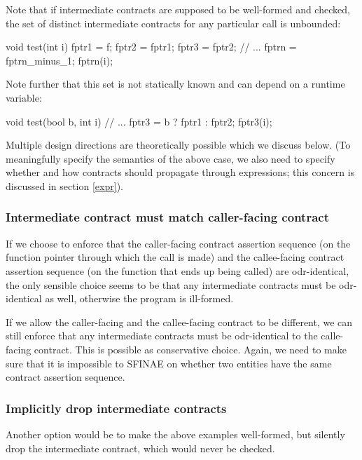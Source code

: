 Note that if intermediate contracts are supposed to be well-formed and checked, the set of distinct intermediate contracts for any particular call is unbounded:
\begin{codeblock}
void test(int i) {
  fptr1 = f;
  fptr2 = fptr1; 
  fptr3 = fptr2;
  // ...
  fptrn = fptrn_minus_1;
  fptrn(i);
}
\end{codeblock}
Note further that this set is not statically known and can depend on a runtime variable:
\begin{codeblock}
void test(bool b, int i) {
  // ...
  fptr3 = b ? fptr1 : fptr2;
  fptr3(i);
}
\end{codeblock}
Multiple design directions are theoretically possible which we discuss below. (To meaningfully specify the semantics of the above case, we also need to specify whether and how contracts should propagate through expressions; this concern is discussed in section \ref{expr}).


\subsubsection{Intermediate contract must match caller-facing contract}
\label{intermediatematch}

If we choose to enforce that the caller-facing contract assertion sequence (on the function pointer through which the call is made) and the callee-facing contract assertion sequence (on the function that ends up being called) are odr-identical, the only sensible choice seems to be that any intermediate contracts must be odr-identical as well, otherwise the program is ill-formed.

If we allow the caller-facing and the callee-facing contract to be different, we can still enforce that any intermediate contracts must be odr-identical to the calle-facing contract. This is possible as conservative choice. Again, we need to make sure that it is impossible to SFINAE on whether two entities have the same contract assertion sequence. 

\subsubsection{Implicitly drop intermediate contracts}
\label{implicitdrop}

Another option would be to make the above examples well-formed, but silently drop the intermediate contract, which would never be checked. 

